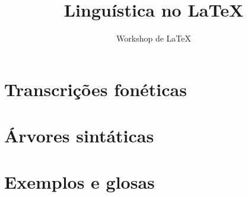 \documentclass[11pt,a4paper,oneside]{article}
\title{Linguística no \LaTeX}
\author{Workshop de LaTeX}
\begin{document}
\frenchspacing

\maketitle

\section{Transcrições fonéticas}
\section{Árvores sintáticas}
\section{Exemplos e glosas}
\end{document}
